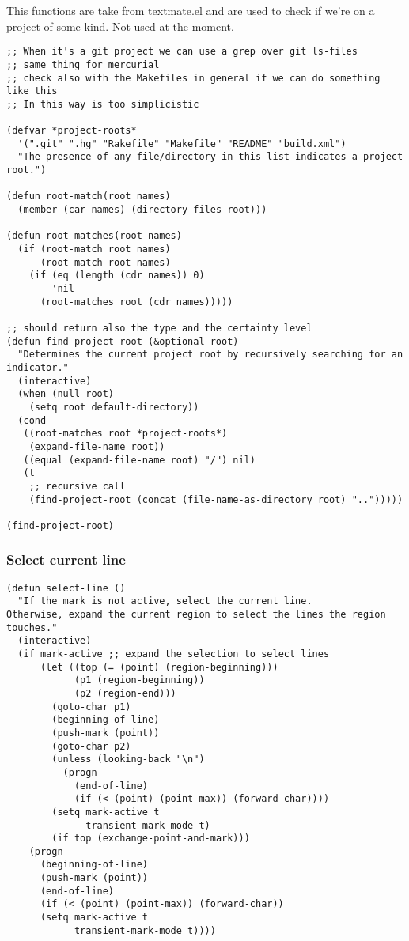 \documentclass[11pt]{article}
\begin{document}
    This functions are take from textmate.el and are used to check if we're on a project of some kind.
    Not used at the moment.

\begin{verbatim}
;; When it's a git project we can use a grep over git ls-files
;; same thing for mercurial
;; check also with the Makefiles in general if we can do something like this
;; In this way is too simplicistic

(defvar *project-roots*
  '(".git" ".hg" "Rakefile" "Makefile" "README" "build.xml")
  "The presence of any file/directory in this list indicates a project root.")

(defun root-match(root names)
  (member (car names) (directory-files root)))

(defun root-matches(root names)
  (if (root-match root names)
      (root-match root names)
    (if (eq (length (cdr names)) 0)
        'nil
      (root-matches root (cdr names)))))

;; should return also the type and the certainty level
(defun find-project-root (&optional root)
  "Determines the current project root by recursively searching for an indicator."
  (interactive)
  (when (null root)
    (setq root default-directory))
  (cond
   ((root-matches root *project-roots*)
    (expand-file-name root))
   ((equal (expand-file-name root) "/") nil)
   (t
    ;; recursive call
    (find-project-root (concat (file-name-as-directory root) "..")))))

(find-project-root)
\end{verbatim}
\subsubsection{Select current line}
\label{sec-18.2.14}

\begin{verbatim}
(defun select-line ()
  "If the mark is not active, select the current line.
Otherwise, expand the current region to select the lines the region touches."
  (interactive)
  (if mark-active ;; expand the selection to select lines
      (let ((top (= (point) (region-beginning)))
            (p1 (region-beginning))
            (p2 (region-end)))
        (goto-char p1)
        (beginning-of-line)
        (push-mark (point))
        (goto-char p2)
        (unless (looking-back "\n")
          (progn
            (end-of-line)
            (if (< (point) (point-max)) (forward-char))))
        (setq mark-active t
              transient-mark-mode t)
        (if top (exchange-point-and-mark)))
    (progn
      (beginning-of-line)
      (push-mark (point))
      (end-of-line)
      (if (< (point) (point-max)) (forward-char))
      (setq mark-active t
            transient-mark-mode t))))
\end{verbatim}
\end{document}
